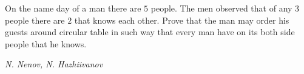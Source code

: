 On the name day of a man there are $5$ people. The men observed that of any $3$ people there are $2$ that knows each other. Prove that the man may order his guests around circular table in such way that every man have on its both side people that he knows.

\textit{N. Nenov, N. Hazhiivanov}